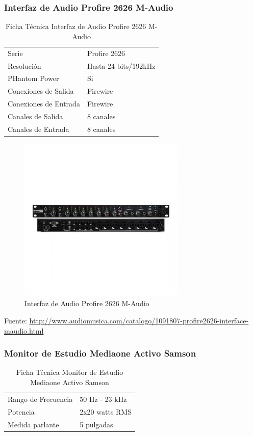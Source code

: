 \subsubsection*{Interfaz de Audio Profire 2626 M-Audio}

\begin{table}[htb!]
\centering
\begin{tabular}{|l|l|}
\hline
Serie & Profire 2626 \\
Resolución & Hasta 24 bits/192kHz \\
PHantom Power & Si \\
Conexiones de Salida & Firewire \\
Conexiones de Entrada & Firewire \\
Canales de Salida & 8 canales\\
Canales de Entrada & 8 canales\\
\hline
\end{tabular}
\caption{Ficha Técnica Interfaz de Audio Profire 2626 M-Audio}
\end{table}

\begin{figure}[h!t]
   \centering
  \includegraphics[scale=0.3]{img/interfaz.jpg}
   \caption{Interfaz de Audio Profire 2626 M-Audio}
   \label{fig:interfaz}
\end{figure}
Fuente: \url{http://www.audiomusica.com/catalogo/1091807-profire2626-interface-maudio.html}

\subsubsection*{Monitor de Estudio Mediaone Activo Samson}

\begin{table}[htb!]
\centering
\begin{tabular}{|l|l|}
\hline
Rango de Frecuencia & 50 Hz - 23 kHz \\
Potencia & 2x20 watts RMS \\
Medida parlante & 5 pulgadas \\
\hline
\end{tabular}
\caption{Ficha Técnica Monitor de Estudio Mediaone Activo Samson}
\end{table}

